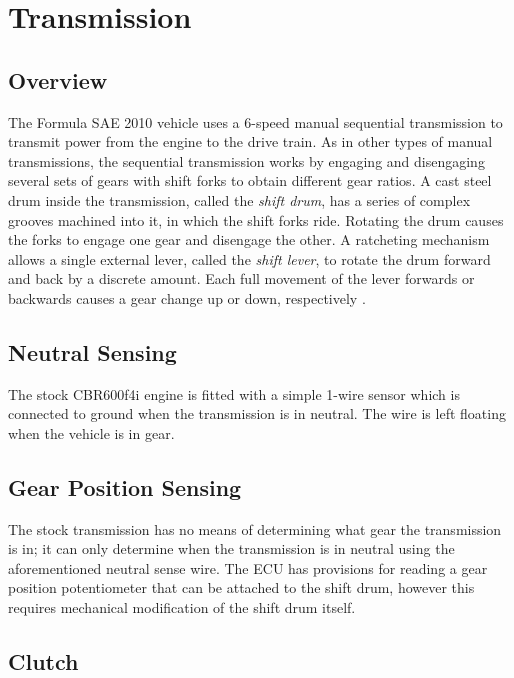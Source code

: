 \section{Transmission}
\label{sec:background_transmission}

\subsection{Overview}

The Formula SAE 2010 vehicle uses a 6-speed manual sequential transmission to transmit power from the engine to the drive train. As in other types of manual transmissions, the sequential transmission works by engaging and disengaging several sets of gears with shift forks to obtain different gear ratios. A cast steel drum inside the transmission, called the \emph{shift drum}, has a series of complex grooves machined into it, in which the shift forks ride. Rotating the drum causes the forks to engage one gear and disengage the other. A ratcheting mechanism allows a single external lever, called the \emph{shift lever}, to rotate the drum forward and back by a discrete amount. Each full movement of the lever forwards or backwards causes a gear change up or down, respectively \cite{HowtoManualTransmission, cbr600}.

\subsection{Neutral Sensing}

The stock CBR600f4i engine is fitted with a simple 1-wire sensor which is connected to ground when the transmission is in neutral. The wire is left floating when the vehicle is in gear.

\subsection{Gear Position Sensing}

The stock transmission has no means of determining what gear the transmission is in; it can only determine when the transmission is in neutral using the aforementioned neutral sense wire. The ECU has provisions for reading a gear position potentiometer that can be attached to the shift drum, however this requires mechanical modification of the shift drum itself.

\subsection{Clutch}

